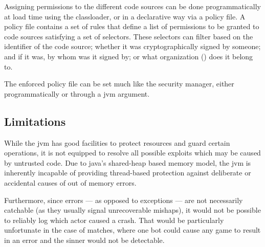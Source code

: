 	Assigning permissions to the different code sources can be done programmatically at load time using the classloader, or in a declarative way via a policy file. A policy file contains a set of rules that define a list of permissions to be granted to code sources satisfying a set of selectors. These selectors can filter based on the identifier of the code source; whether it was cryptographically signed by someone; and if it was, by whom was it signed by; or what organization () does it belong to.
	
	The enforced policy file can be set much like the security manager, either programmatically or through a jvm argument. 

	\subsection{Limitations}
	
	While the jvm has good facilities to protect resources and guard certain operations, it is not equipped to resolve all possible exploits which may be caused by untrusted code. Due to java's shared-heap based memory model, the jvm is inherently incapable of providing thread-based protection against deliberate or accidental causes of out of memory errors.
	
	Furthermore, since errors --- as opposed to exceptions --- are not necessarily catchable (as they usually signal unrecoverable mishaps), it would not be possible to reliably log which actor caused a crash. That would be particularly unfortunate in the case of matches, where one bot could cause any game to result in an error and the sinner would not be detectable.  

%








